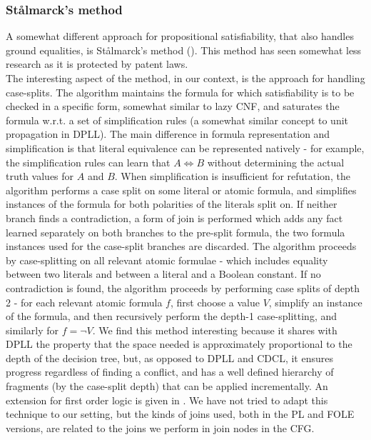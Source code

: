 \subsubsection*{St\aa lmarck's method}
A somewhat different approach for propositional satisfiability, that also handles ground equalities, is St\aa lmarck's method (\cite{DBLP:conf/fmcad/SheeranS98}). This method has seen somewhat less research as it is protected by patent laws.\\
The interesting aspect of the method, in our context, is the approach for handling case-splits.
The algorithm maintains the formula for which satisfiability is to be checked in a specific form, somewhat similar to lazy CNF,  
and saturates the formula w.r.t. a set of simplification rules (a somewhat similar concept to unit propagation in DPLL).
The main difference in formula representation and simplification is that literal equivalence can be represented natively - for example,
the simplification rules can learn that $A \Leftrightarrow B$ without determining the actual truth values for $A$ and $B$.
When simplification is insufficient for refutation, the algorithm performs a case split on some literal or atomic formula, 
and simplifies instances of the formula for both polarities of the literals split on. 
If neither branch finds a contradiction, a form of join is performed which adds any fact learned separately on both branches to the pre-split formula, the two formula instances used for the case-split branches are discarded.
The algorithm proceeds by case-splitting on all relevant atomic formulae - which includes equality between two literals and between a literal and a Boolean constant.
If no contradiction is found, the algorithm proceeds by performing case splits of depth 2 - for each relevant atomic formula $f$, first choose a value $V$, simplify an instance of the formula, and then recursively perform the depth-1 case-splitting, and similarly for $f=\lnot V$.
We find this method interesting because it shares with DPLL the property that the space needed is approximately proportional to the depth of the decision tree, but, as opposed to DPLL and CDCL, it ensures progress regardless of finding a conflict, and has a well defined hierarchy of fragments (by the case-split depth) that can be applied incrementally.
An extension for first order logic is given in \cite{Björk2009}.
We have not tried to adapt this technique to our setting, but the kinds of joins used, both in the PL and FOLE versions, are related to the joins we perform in join nodes in the CFG.


